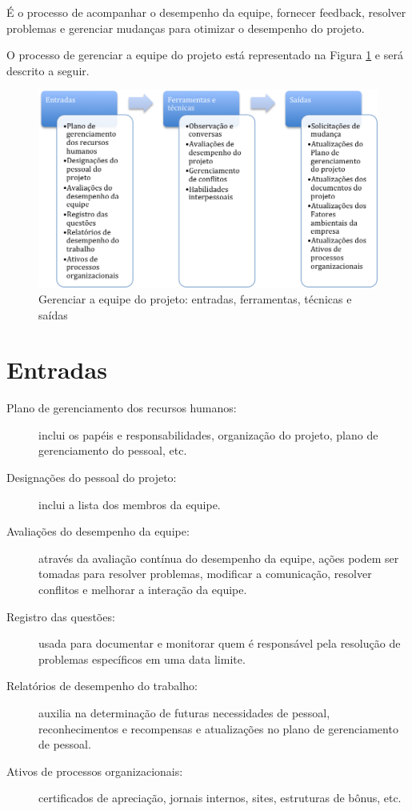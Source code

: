 
É o processo de acompanhar o desempenho da equipe, fornecer feedback, resolver problemas e gerenciar mudanças para otimizar o desempenho do projeto.

O processo de gerenciar a equipe do projeto está representado na Figura \ref{fig:rh:ger:efts} e será descrito a seguir.

\begin{figure}[!h]
	\centering
	\includegraphics[scale=0.5]{Figuras/rh_efts_gerenciar.png}
	\caption{Gerenciar a equipe do projeto: entradas, ferramentas, técnicas e saídas}
	\label{fig:rh:ger:efts}
\end{figure}

\section{Entradas}

\begin{description}

	\item[Plano de gerenciamento dos recursos humanos:] inclui os papéis e responsabilidades, organização do projeto, plano de gerenciamento do pessoal, etc.
	
	\item[Designações do pessoal do projeto:] inclui a lista dos membros da equipe.
	
	\item[Avaliações do desempenho da equipe:] através da avaliação contínua do desempenho da equipe, ações podem ser tomadas para resolver problemas, modificar a comunicação, resolver conflitos e melhorar a interação da equipe.
	
	\item[Registro das questões:] usada para documentar e monitorar quem é responsável pela resolução de problemas específicos em uma data limite.
	
	\item[Relatórios de desempenho do trabalho:] auxilia na determinação de futuras necessidades de pessoal, reconhecimentos e recompensas e atualizações no plano de gerenciamento de pessoal.
	
	\item[Ativos de processos organizacionais:] certificados de apreciação, jornais internos, sites, estruturas de bônus, etc.
	
\end{description}

